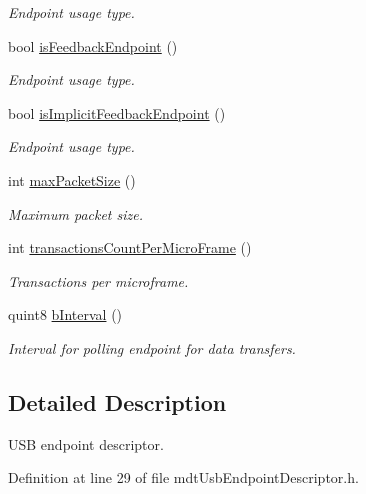\begin{DoxyCompactItemize}
\begin{DoxyCompactList}\small\item\em Endpoint usage type. \end{DoxyCompactList}\item 
bool \hyperlink{classmdt_usb_endpoint_descriptor_a4a0da79423ca913e32016b89e5b48e5c}{is\-Feedback\-Endpoint} ()
\begin{DoxyCompactList}\small\item\em Endpoint usage type. \end{DoxyCompactList}\item 
bool \hyperlink{classmdt_usb_endpoint_descriptor_a9a22e038a2e227af30e77d596f4990fa}{is\-Implicit\-Feedback\-Endpoint} ()
\begin{DoxyCompactList}\small\item\em Endpoint usage type. \end{DoxyCompactList}\item 
int \hyperlink{classmdt_usb_endpoint_descriptor_ae7bdf4803a50206fdb9b30008b9bc230}{max\-Packet\-Size} ()
\begin{DoxyCompactList}\small\item\em Maximum packet size. \end{DoxyCompactList}\item 
int \hyperlink{classmdt_usb_endpoint_descriptor_acc5881f4e94f4b1014ecbe9f6a3f3405}{transactions\-Count\-Per\-Micro\-Frame} ()
\begin{DoxyCompactList}\small\item\em Transactions per microframe. \end{DoxyCompactList}\item 
quint8 \hyperlink{classmdt_usb_endpoint_descriptor_ab2b12df2f8bd4024f118fe1293bc3bf4}{b\-Interval} ()
\begin{DoxyCompactList}\small\item\em Interval for polling endpoint for data transfers. \end{DoxyCompactList}\end{DoxyCompactItemize}


\subsection{Detailed Description}
U\-S\-B endpoint descriptor. 

Definition at line 29 of file mdt\-Usb\-Endpoint\-Descriptor.\-h.



